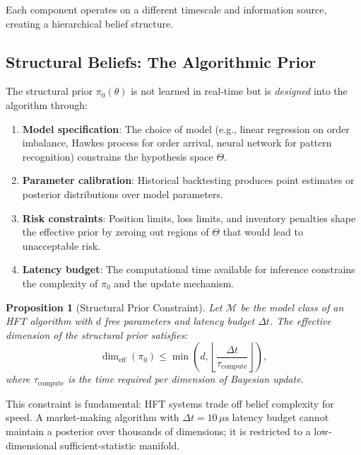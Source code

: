 \documentclass[12pt,a4paper]{article}
\newtheorem{proposition}[theorem]{Proposition}
\theoremstyle{definition}
\begin{document}
Each component operates on a different timescale and information source, creating a hierarchical belief structure.

\subsection{Structural Beliefs: The Algorithmic Prior}

The structural prior $\pi_0(\theta)$ is not learned in real-time but is \emph{designed} into the algorithm through:

\begin{enumerate}
  \item \textbf{Model specification}: The choice of model (e.g., linear regression on order imbalance, Hawkes process for order arrival, neural network for pattern recognition) constrains the hypothesis space $\Theta$.

  \item \textbf{Parameter calibration}: Historical backtesting produces point estimates or posterior distributions over model parameters.

  \item \textbf{Risk constraints}: Position limits, loss limits, and inventory penalties shape the effective prior by zeroing out regions of $\Theta$ that would lead to unacceptable risk.

  \item \textbf{Latency budget}: The computational time available for inference constrains the complexity of $\pi_0$ and the update mechanism.
\end{enumerate}

\begin{proposition}[Structural Prior Constraint]\label{prop:structural-constraint}
Let $\mathcal{M}$ be the model class of an HFT algorithm with $d$ free parameters and latency budget $\Delta t$. The effective dimension of the structural prior satisfies:
\begin{equation}
  \dim_{\mathrm{eff}}(\pi_0) \leq \min\left(d, \left\lfloor \frac{\Delta t}{\tau_{\mathrm{compute}}} \right\rfloor\right),
\end{equation}
where $\tau_{\mathrm{compute}}$ is the time required per dimension of Bayesian update.
\end{proposition}

This constraint is fundamental: HFT systems trade off belief complexity for speed. A market-making algorithm with $\Delta t = 10\,\mu\mathrm{s}$ latency budget cannot maintain a posterior over thousands of dimensions; it is restricted to a low-dimensional sufficient-statistic manifold.
\end{document}
